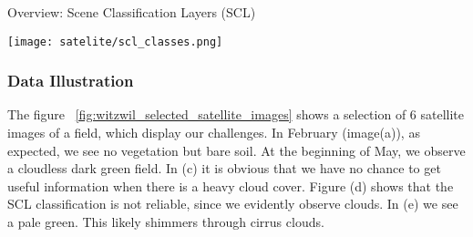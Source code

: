 {{			
			\begin{table}[h]
				\caption{Overview: Scene Classification Layers (SCL)}
				\label{tab:satelite/scl_classes}
				\center
				\texttt{[image: satelite/scl\_classes.png]}
			\end{table}
		}

		\subsubsection*{Data Illustration}{
			
			The figure ~\ref{fig:witzwil_selected_satellite_images} shows a selection of 6 satellite images of a field, which display our challenges. In February (image(a)), as expected, we see no vegetation but bare soil. At the beginning of May, we observe a cloudless dark green field. In (c) it is obvious that we have no chance to get useful information when there is a heavy cloud cover. Figure (d) shows that the SCL classification is not reliable, since we evidently observe clouds. In (e) we see a pale green. This likely shimmers through cirrus clouds. 
			
		}
	}

